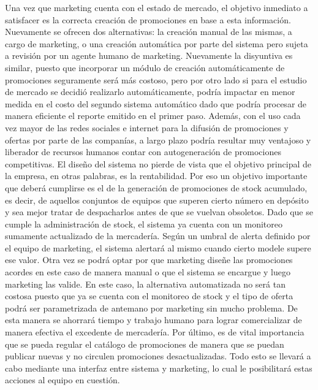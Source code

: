\indent Una vez que marketing cuenta con el estado de mercado, el objetivo inmediato a satisfacer es la correcta creación de promociones en base a esta información. Nuevamente se ofrecen dos alternativas: la creación manual de las mismas, a cargo de marketing, o una creación automática por parte del sistema pero sujeta a revisión por un agente humano de marketing. Nuevamente la disyuntiva es similar, puesto que incorporar un módulo de creación automáticamente de promociones seguramente será más costoso, pero por otro lado si para el estudio de mercado se decidió realizarlo automáticamente, podría impactar en menor medida en el costo del segundo sistema automático dado que podría procesar de manera eficiente el reporte emitido en el primer paso. Además, con el uso cada vez mayor de las redes sociales e internet para la difusión de promociones y ofertas por parte de las companías, a largo plazo podría resultar muy ventajoso y liberador de recursos humanos contar con autogeneración de promociones competitivas. 
El diseño del sistema no pierde de vista que el objetivo principal de la empresa, en otras palabras, es la rentabilidad. Por eso un objetivo importante que deberá cumplirse es el de la generación de promociones de stock acumulado, es decir, de aquellos conjuntos de equipos que superen cierto número en depósito y sea mejor tratar de despacharlos antes de que se vuelvan obsoletos. Dado que se cumple la administración de stock, el sistema ya cuenta con un monitoreo sumamente actualizado de la mercadería. Según un umbral de alerta definido por el equipo de marketing, el sistema alertará al mismo cuando cierto modele supere ese valor. Otra vez se podrá optar por que marketing diseñe las promociones acordes en este caso de manera manual o que el sistema se encargue y luego marketing las valide. En este caso, la alternativa automatizada no será tan costosa puesto que ya se cuenta con el monitoreo de stock y el tipo de oferta podrá ser parametrizada de antemano por marketing sin mucho problema. De esta manera se ahorrará tiempo y trabajo humano para lograr comercializar de manera efectiva el excedente de mercadería. Por último, es de vital importancia que se pueda regular el catálogo de promociones de manera que se puedan publicar nuevas y no circulen promociones desactualizadas. Todo esto se llevará a cabo mediante una interfaz entre sistema y marketing, lo cual le posibilitará estas acciones al equipo en cuestión. 

\clearpage

